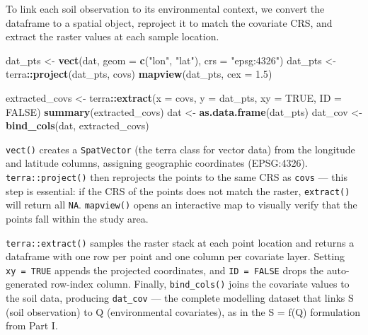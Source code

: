 \documentclass[
  10pt,
  b5paper,
  oneside]{book}
\newenvironment{Shaded}{\begin{snugshade}}{\end{snugshade}}
\newcommand{\AttributeTok}[1]{\textcolor[rgb]{0.13,0.29,0.53}{#1}}
\newcommand{\ConstantTok}[1]{\textcolor[rgb]{0.56,0.35,0.01}{#1}}
\newcommand{\FloatTok}[1]{\textcolor[rgb]{0.00,0.00,0.81}{#1}}
\newcommand{\FunctionTok}[1]{\textcolor[rgb]{0.13,0.29,0.53}{\textbf{#1}}}
\newcommand{\NormalTok}[1]{#1}
\newcommand{\OtherTok}[1]{\textcolor[rgb]{0.56,0.35,0.01}{#1}}
\newcommand{\SpecialCharTok}[1]{\textcolor[rgb]{0.81,0.36,0.00}{\textbf{#1}}}
\newcommand{\StringTok}[1]{\textcolor[rgb]{0.31,0.60,0.02}{#1}}
\begin{document}
To link each soil observation to its environmental context, we convert the dataframe to a spatial object, reproject it to match the covariate CRS, and extract the raster values at each sample location.

\begin{Shaded}
\begin{Highlighting}[]
\NormalTok{dat\_pts }\OtherTok{\textless{}{-}} \FunctionTok{vect}\NormalTok{(dat, }\AttributeTok{geom =} \FunctionTok{c}\NormalTok{(}\StringTok{"lon"}\NormalTok{, }\StringTok{"lat"}\NormalTok{), }\AttributeTok{crs =} \StringTok{"epsg:4326"}\NormalTok{)}
\NormalTok{dat\_pts }\OtherTok{\textless{}{-}}\NormalTok{ terra}\SpecialCharTok{::}\FunctionTok{project}\NormalTok{(dat\_pts, covs)}
\FunctionTok{mapview}\NormalTok{(dat\_pts, }\AttributeTok{cex =} \FloatTok{1.5}\NormalTok{)}

\NormalTok{extracted\_covs }\OtherTok{\textless{}{-}}\NormalTok{ terra}\SpecialCharTok{::}\FunctionTok{extract}\NormalTok{(}\AttributeTok{x =}\NormalTok{ covs, }\AttributeTok{y =}\NormalTok{ dat\_pts, }\AttributeTok{xy =} \ConstantTok{TRUE}\NormalTok{, }\AttributeTok{ID =} \ConstantTok{FALSE}\NormalTok{)}
\FunctionTok{summary}\NormalTok{(extracted\_covs)}
\NormalTok{dat }\OtherTok{\textless{}{-}} \FunctionTok{as.data.frame}\NormalTok{(dat\_pts)}
\NormalTok{dat\_cov }\OtherTok{\textless{}{-}} \FunctionTok{bind\_cols}\NormalTok{(dat, extracted\_covs)}
\end{Highlighting}
\end{Shaded}

\texttt{vect()} creates a \texttt{SpatVector} (the terra class for vector data) from the longitude and latitude columns, assigning geographic coordinates (EPSG:4326). \texttt{terra::project()} then reprojects the points to the same CRS as \texttt{covs} --- this step is essential: if the CRS of the points does not match the raster, \texttt{extract()} will return all \texttt{NA}. \texttt{mapview()} opens an interactive map to visually verify that the points fall within the study area.

\texttt{terra::extract()} samples the raster stack at each point location and returns a dataframe with one row per point and one column per covariate layer. Setting \texttt{xy\ =\ TRUE} appends the projected coordinates, and \texttt{ID\ =\ FALSE} drops the auto-generated row-index column. Finally, \texttt{bind\_cols()} joins the covariate values to the soil data, producing \texttt{dat\_cov} --- the complete modelling dataset that links S (soil observation) to Q (environmental covariates), as in the S = f(Q) formulation from Part I.
\end{document}
